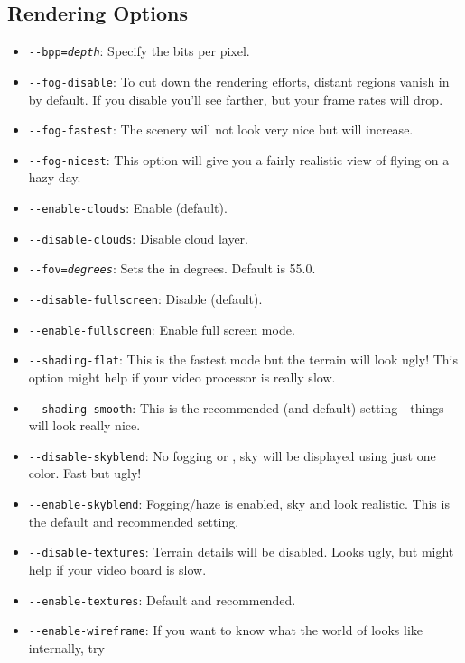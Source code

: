 \subsection{Rendering Options}
\begin{itemize}
\item{\texttt{-$ $-bpp={\it depth}}}: Specify the bits per pixel.
\item{\texttt{-$ $-fog-disable}}: To cut down the rendering efforts, distant
  regions vanish in  by default. If you disable  you'll see farther, but your frame rates will drop.
\item{\texttt{-$ $-fog-fastest}}: The scenery will not look very nice but
   will increase.
\item{\texttt{-$ $-fog-nicest}}: This option will give you a fairly realistic
  view of flying on a hazy day.
\item{\texttt{-$ $-enable-clouds}}: Enable  (default).
\item{\texttt{-$ $-disable-clouds}}: Disable cloud layer.
\item{\texttt{-$ $-fov={\it degrees}}}: Sets the  in degrees.
Default is 55.0.
\item{\texttt{-$ $-disable-fullscreen}}: Disable  (default).
\item{\texttt{-$ $-enable-fullscreen}}: Enable full screen mode.
\item{\texttt{-$ $-shading-flat}}: This is the fastest mode but the terrain will look ugly!
This option might help if your video processor is really slow.
\item{\texttt{-$ $-shading-smooth}}: This is the recommended (and default) setting - things will look really nice.
\item{\texttt{-$ $-disable-skyblend}}: No fogging or , sky will be displayed
  using just one color. Fast but ugly!
\item{\texttt{-$ $-enable-skyblend}}: Fogging/haze is enabled, sky and  look realistic. This is the default and recommended setting.
\item{\texttt{-$ $-disable-textures}}: Terrain details will be disabled. Looks ugly, but might help if your video board is slow.
\item{\texttt{-$ $-enable-textures}}: Default and recommended.
\item{\texttt{-$ $-enable-wireframe}}: If you want to know what the world of \FlightGear{} looks like internally, try

\end{itemize}
